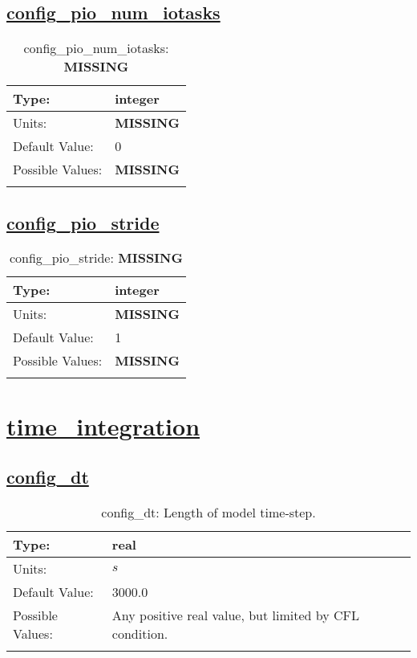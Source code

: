 \subsection[config\_pio\_num\_iotasks]{\hyperref[sec:nm_tab_io]{config\_pio\_num\_iotasks}}
\label{subsec:nm_sec_config_pio_num_iotasks}
\begin{center}
\begin{longtable}{| p{2.0in} | p{4.0in} |}
    \hline
    Type: & integer \\
    \hline
    Units: & {\bf \color{red} MISSING} \\
    \hline
    Default Value: & 0 \\
    \hline
    Possible Values: & {\bf \color{red} MISSING} \\
    \hline
    \caption{config\_pio\_num\_iotasks: {\bf \color{red} MISSING}}
\end{longtable}
\end{center}
\subsection[config\_pio\_stride]{\hyperref[sec:nm_tab_io]{config\_pio\_stride}}
\label{subsec:nm_sec_config_pio_stride}
\begin{center}
\begin{longtable}{| p{2.0in} | p{4.0in} |}
    \hline
    Type: & integer \\
    \hline
    Units: & {\bf \color{red} MISSING} \\
    \hline
    Default Value: & 1 \\
    \hline
    Possible Values: & {\bf \color{red} MISSING} \\
    \hline
    \caption{config\_pio\_stride: {\bf \color{red} MISSING}}
\end{longtable}
\end{center}
\section[time\_integration]{\hyperref[sec:nm_tab_time_integration]{time\_integration}}
\label{sec:nm_sec_time_integration}
\subsection[config\_dt]{\hyperref[sec:nm_tab_time_integration]{config\_dt}}
\label{subsec:nm_sec_config_dt}
\begin{center}
\begin{longtable}{| p{2.0in} | p{4.0in} |}
    \hline
    Type: & real \\
    \hline
    Units: & $s$ \\
    \hline
    Default Value: & 3000.0 \\
    \hline
    Possible Values: & Any positive real value, but limited by CFL condition. \\
    \hline
    \caption{config\_dt: Length of model time-step.}
\end{longtable}
\end{center}
